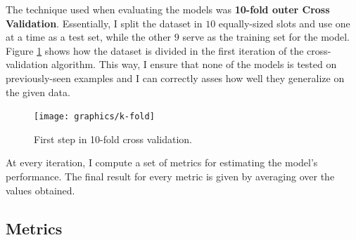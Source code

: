 		The technique used when evaluating the models was \textbf{10-fold outer Cross Validation}. Essentially, I split the dataset in $10$ equally-sized slots and use one at a time as a test set, while the other $9$ serve as the training set for the model. Figure \ref{Fig: impl/ml/methodology/kfold/first} shows how the dataset is divided in the first iteration of the cross-validation algorithm. This way, I ensure that none of the models is tested on previously-seen examples and I can correctly asses how well they generalize on the given data.
		\begin{figure}[H]
			\centering
			\texttt{[image: graphics/k-fold]}
			\caption{First step in 10-fold cross validation.}
			\label{Fig: impl/ml/methodology/kfold/first}
		\end{figure}
		
		At every iteration, I compute a set of metrics for estimating the model's performance. The final result for every metric is given by averaging over the values obtained. 
	\subsection{Metrics} \label{Section: eval/ml/metrics}
	
